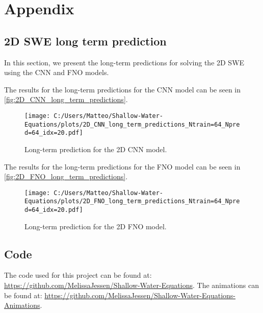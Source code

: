 \appendix
\chapter{Appendix}

\section{2D SWE long term prediction}\label{app:2D_SWE_long_term_prediction}
In this section, we present the long-term predictions for solving the 2D SWE using the CNN and FNO models.

The results for the long-term predictions for the CNN model can be seen in \autoref{fig:2D_CNN_long_term_predictions}.
\begin{figure}[H]
    \centering
    \texttt{[image: C:/Users/Matteo/Shallow-Water-Equations/plots/2D\_CNN\_long\_term\_predictions\_Ntrain=64\_Npred=64\_idx=20.pdf]}
    \caption{Long-term prediction for the 2D CNN model.}\label{fig:2D_CNN_long_term_predictions}
\end{figure}

The results for the long-term predictions for the FNO model can be seen in \autoref{fig:2D_FNO_long_term_predictions}.
\begin{figure}[H]
    \centering
    \texttt{[image: C:/Users/Matteo/Shallow-Water-Equations/plots/2D\_FNO\_long\_term\_predictions\_Ntrain=64\_Npred=64\_idx=20.pdf]}
    \caption{Long-term prediction for the 2D FNO model.}\label{fig:2D_FNO_long_term_predictions}
\end{figure}


\section{Code}
The code used for this project can be found at: \url{https://github.com/MelissaJessen/Shallow-Water-Equations}.
The animations can be found at: \url{https://github.com/MelissaJessen/Shallow-Water-Equations-Animations}.

